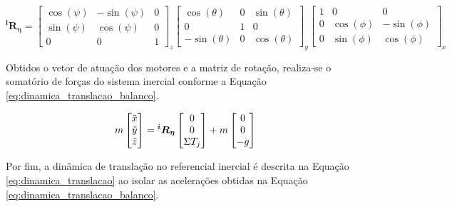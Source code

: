 \documentclass[main.tex]{subfiles}
\begin{document}
\begin{equation}\label{eq:rotational_matrix_raw}
    \boldsymbol{^iR_\eta} = 
     \begin{bmatrix}
        \cos(\psi)  &   -\sin(\psi) &   0\\
        \sin(\psi)  &   \cos(\psi)  &   0\\
        0           &   0           &   1
    \end{bmatrix}_z
    \begin{bmatrix}
        \cos(\theta)    &   0             &   \sin(\theta)  \\
        0               &   1               &   0           \\
        -\sin(\theta)   &   0             &   \cos(\theta)
    \end{bmatrix}_y
   \begin{bmatrix}
        1           &   0           &   0               \\
        0           &   \cos(\phi)  &   -\sin(\phi)   \\
        0           &   \sin(\phi)  &   \cos(\phi)
    \end{bmatrix}_x
\end{equation}

Obtidos o vetor de atuação dos motores e a matriz de rotação, realiza-se o somatório de forças do sistema inercial conforme a Equação \ref{eq:dinamica_translacao_balanco}.

\begin{equation}\label{eq:dinamica_translacao_balanco}
    m \begin{bmatrix}
        \Ddot{x}\\
        \Ddot{y}\\
        \Ddot{z}
    \end{bmatrix} = \boldsymbol{^iR_\eta}
    \begin{bmatrix}
        0\\
        0\\
        \Sigma T_j
    \end{bmatrix} + m
    \begin{bmatrix}
        0\\
        0\\
        -g
    \end{bmatrix}
\end{equation}

Por fim, a dinâmica de translação no referencial inercial é descrita na Equação \ref{eq:dinamica_translacao} ao isolar as acelerações obtidas na Equação \ref{eq:dinamica_translacao_balanco}.
\end{document}
